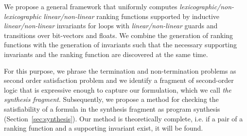 \documentclass[preprint]{sigplanconf}
\theoremstyle{definition}
\newcommand{\todo}[1]{{\bf TODO:} #1}
\begin{document}





We propose a general framework that %
uniformly computes
\emph{lexicographic/non-lexicographic} \emph{linear/non-linear} 
ranking functions supported by inductive \emph{linear/non-linear} invariants for loops with 
\emph{linear/non-linear} guards and transitions over bit-vectors and floats.
We combine the generation of ranking functions with the generation of invariants such that the necessary 
supporting invariants and the ranking function are discovered at the same time.

 
For this purpose, we phrase the termination and non-termination problems as second order satisfaction problem and
we identify a fragment of second-order logic that is expressive enough to capture our formulation, 
which we call \emph{the synthesis fragment}. Subsequently, we propose a method 
for checking the satisfiability of a formula in the synthesis fragment as program synthesis (Section~\ref{sec:synthesis}). 
Our method is theoretically complete, i.e. if a pair of a ranking function and a supporting invariant 
exist, it will be found. 
\end{document}
